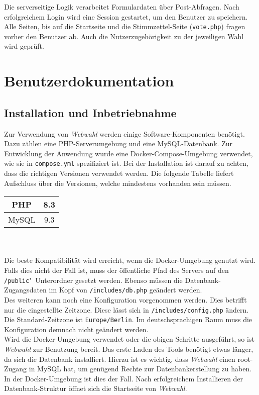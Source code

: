 \documentclass[a4paper]{scrartcl}
\newcommand{\file}[1]{\texttt{#1}}
\newcommand{\code}[1]{\texttt{#1}}
\begin{document}
	\noindent Die serverseitige Logik verarbeitet Formulardaten über Post-Abfragen. Nach erfolgreichem Login wird eine Session gestartet, um den Benutzer zu speichern. Alle Seiten, bis auf die Startseite und die Stimmzettel-Seite (\file{vote.php}) fragen vorher den Benutzer ab. Auch die Nutzerzugehörigkeit zu der jeweiligen Wahl wird geprüft.
	
	
	\section{Benutzerdokumentation}
	
	\subsection{Installation und Inbetriebnahme}
	Zur Verwendung von \textit{Webwahl} werden einige Software-Komponenten benötigt. Dazu zählen eine PHP-Serverumgebung und eine MySQL-Datenbank. Zur Entwicklung der Anwendung wurde eine Docker-Compose-Umgebung verwendet, wie sie in \file{compose.yml} spezifiziert ist. Bei der Installation ist darauf zu achten, dass die richtigen Versionen verwendet werden. Die folgende Tabelle liefert Aufschluss über die Versionen, welche mindestens vorhanden sein müssen.\\
	
	\begin{tabular}{|c|c|}
		\hline
		PHP & 8.3 \\
		\hline
		MySQL & 9.3 \\
		\hline
	\end{tabular}\\\\
	
	\noindent Die beste Kompatibilität wird erreicht, wenn die Docker-Umgebung genutzt wird. Falls dies nicht der Fall ist, muss der öffentliche Pfad des Servers auf den \file{/public}"~Unterordner gesetzt werden. Ebenso müssen die Datenbank-Zugangsdaten im Kopf von \file{/includes/db.php} geändert werden.\\
	
	\noindent Des weiteren kann noch eine Konfiguration vorgenommen werden. Dies betrifft nur die eingestellte Zeitzone. Diese lässt sich in \file{/includes/config.php} ändern. Die Standard-Zeitzone ist \code{Europe/Berlin}. Im deutschsprachigen Raum muss die Konfiguration demnach nicht geändert werden.\\
	
	\noindent Wird die Docker-Umgebung verwendet oder die obigen Schritte ausgeführt, so ist \textit{Webwahl} zur Benutzung bereit. Das erste Laden des Tools benötigt etwas länger, da sich die Datenbank installiert. Hierzu ist es wichtig, dass \textit{Webwahl} einen root-Zugang in MySQL hat, um genügend Rechte zur Datenbankerstellung zu haben. In der Docker-Umgebung ist dies der Fall. Nach erfolgreichem Installieren der Datenbank-Struktur öffnet sich die Startseite von \textit{Webwahl}.
	
\end{document}

